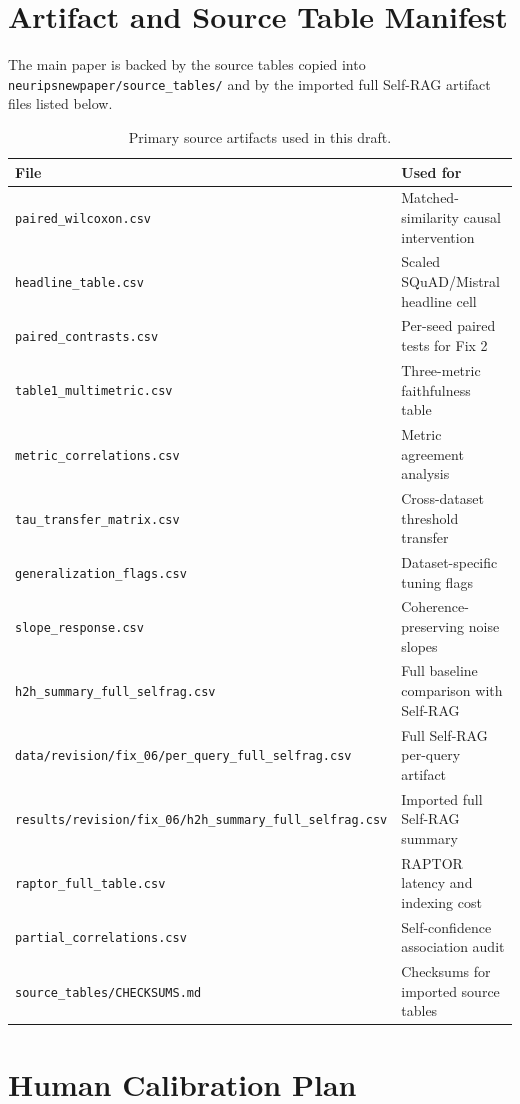 \section{Artifact and Source Table Manifest}

The main paper is backed by the source tables copied into
\texttt{neuripsnewpaper/source\_tables/} and by the imported full Self-RAG
artifact files listed below.

\begin{table}[H]
\centering
\small
\caption{Primary source artifacts used in this draft.}
\begin{tabular}{ll}
\toprule
File & Used for \\
\midrule
\texttt{paired\_wilcoxon.csv} & Matched-similarity causal intervention \\
\texttt{headline\_table.csv} & Scaled SQuAD/Mistral headline cell \\
\texttt{paired\_contrasts.csv} & Per-seed paired tests for Fix 2 \\
\texttt{table1\_multimetric.csv} & Three-metric faithfulness table \\
\texttt{metric\_correlations.csv} & Metric agreement analysis \\
\texttt{tau\_transfer\_matrix.csv} & Cross-dataset threshold transfer \\
\texttt{generalization\_flags.csv} & Dataset-specific tuning flags \\
\texttt{slope\_response.csv} & Coherence-preserving noise slopes \\
\texttt{h2h\_summary\_full\_selfrag.csv} & Full baseline comparison with Self-RAG \\
\texttt{data/revision/fix\_06/per\_query\_full\_selfrag.csv} & Full Self-RAG per-query artifact \\
\texttt{results/revision/fix\_06/h2h\_summary\_full\_selfrag.csv} & Imported full Self-RAG summary \\
\texttt{raptor\_full\_table.csv} & RAPTOR latency and indexing cost \\
\texttt{partial\_correlations.csv} & Self-confidence association audit \\
\texttt{source\_tables/CHECKSUMS.md} & Checksums for imported source tables \\
\bottomrule
\end{tabular}
\end{table}

\section{Human Calibration Plan}

